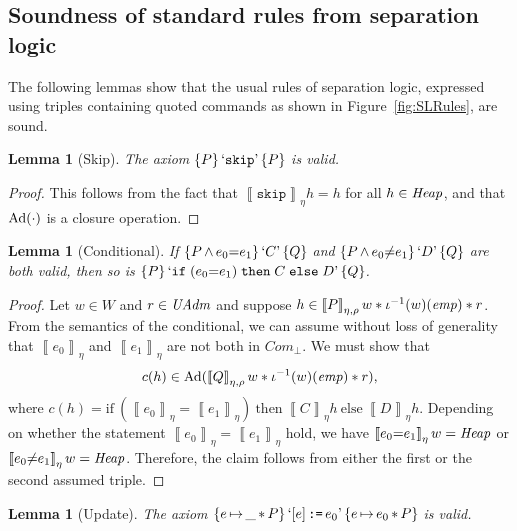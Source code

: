 \documentclass{LMCS}
\newtheorem{lemma}[theorem]{Lemma}
\theoremstyle{remark}
\newcommand{\Com}{\ensuremath{\mathit{Com}}\xspace}
\newcommand{\QUOTE}[1]{\textnormal{`\ensuremath{#1}'}}
\newcommand{\SYN}[1]{\ensuremath{\texttt{#1}}}
\newcommand{\key}[1]{\ensuremath{\mathrm{#1}}\xspace}
\newcommand{\triple}[3]{{\ensuremath{\!\left.\{ #1 \}\, #2\, \{  #3 \}\!\right.}}}
\newcommand{\wemp}{\textnormal{\textit{emp}}}
\newcommand{\den}[1]{\left\llbracket #1
  \right\rrbracket}
\newcommand{\EXPden}[1]{\ensuremath{\den{#1}}}
\newcommand{\W}{\ensuremath{W}}
\newcommand{\UNFOLD}{\ensuremath{\iota^{-1}}}
\begin{document}
\subsection{Soundness of standard rules from separation logic}
\label{app:subsec:HoareLogicRules}

The following lemmas show that the usual rules of separation logic, 
expressed using triples containing quoted commands as shown in Figure~\ref{fig:SLRules}, are sound. 

\begin{lemma}[Skip] 
The axiom $\triple{P}{\QUOTE{\SYN{skip}}}{P}$ is valid. 
\end{lemma}

\begin{proof}
This follows from the fact that $\den{\SYN{skip}}_\eta h = h$ for all $h\in\mathit{Heap}$, and that $\mathrm{Ad}(\cdot)$ is a closure operation. 
\end{proof}

\begin{lemma}[Conditional]
If $\triple{P \,{\wedge}\, e_0{=}e_1}{\QUOTE{C}}{Q}$ 
and $\triple{P \,{\wedge}\, e_0{\not=}e_1}{\QUOTE{D}}{Q}$ are both valid, 
then so is $\triple{P}{\QUOTE{\SYN{if}\;(e_0{=}e_1)\;\SYN{then}\;C\;\SYN{else}\;D}}{Q}$. 
\end{lemma}

\begin{proof}
Let $w\in\W$ and $r\in\mathit{UAdm}$ and suppose $h\in\den{P}_{\eta,\rho} w * \UNFOLD(w)(\wemp) *r$. From the semantics of 
the conditional, we can assume without loss of generality that $\den{e_0}_\eta$ and $\den{e_1}_\eta$ 
are not both in $\Com_\bot$. We must show that 
\begin{align*}
c(h)\in\DCl(\den{Q}_{\eta,\rho} w * \UNFOLD(w)(\wemp) *r) ,
\end{align*}
where $c(h) = \key{if}~(\EXPden{e_0}_\eta{=}\EXPden{e_1}_\eta)~\key{then}~\den{C}_\eta h~\key{else}~\den{D}_\eta h$.
Depending on whether the statement $\EXPden{e_0}_\eta{=}\EXPden{e_1}_\eta$ hold, we have $\den{e_0{=}e_1}_\eta w = \Heap$ or $\den{e_0 {\not=} e_1}_\eta w = \Heap$. Therefore, the claim follows from either the first or the second assumed triple. 
\end{proof}

\begin{lemma}[Update]
The axiom $\triple{e\,{\mapsto}\,\_ \,{*}\,P}{\QUOTE{[e] \, \SYN{:=}\, e_0}}{e\,{\mapsto}\,e_0\,{*}\,P}$ is valid. 
\end{lemma}
\end{document}

